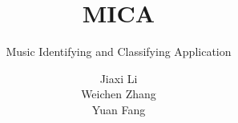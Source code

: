 \documentclass[whitelogo,12pt]{tudelft-report}
\begin{document}
\frontmatter

 \title[black]{MICA}
 \subtitle[tudelft-cyan]{Music Identifying and Classifying Application}
 \author[tudelft-white]{Jiaxi Li\\Weichen Zhang\\Yuan Fang}
 \titleoffsetx{10cm}
 \titleoffsety{10cm}
 \afiloffsetx{1cm}
 \afiloffsety{18cm}
\let\cleardoublepage\clearpage



\end{document}
